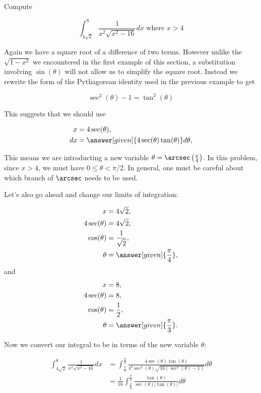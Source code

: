 \documentclass{ximera}
\begin{document}
\begin{example}
Compute 

\[
\int_{4\sqrt{2}}^{8} \frac{1}{ x^{2}\sqrt{x^{2}-16}} dx \text{ where } x > 4
\]

\begin{explanation}
Again we have a square root of a difference of two terms. However unlike the $\sqrt{1-x^{2}}$ we encountered 
in the first example of this section, a substitution involving $\sin(\theta)$ will not allow us to simplify 
the square root. Instead we rewrite the form of the Pythagorean identity used in the previous example to get 

\[
\sec^{2}(\theta)-1=\tan^{2}(\theta)
\]

This suggests that we should use 

 \begin{align*}
      x &= 4\sec(\theta),\\
      dx &= \answer[given]{4\sec(\theta)\tan(\theta)} d\theta,
    \end{align*}

\begin{remark}
This means we are introducting a new variable $\theta=\arcsec\left(\frac{x}{4}\right)$. 
In this problem, since $x > 4$, we must have $0 \leq \theta < \pi/2 $.  In general, one must be careful about which branch of $\arcsec$ needs to be used. 
\end{remark}
Let's also go ahead and change our limits of integration:


    \begin{align*}
      x &= 4\sqrt{2},\\
     4 \sec(\theta) &=4\sqrt{2},\\
       \cos(\theta)&=\frac{1}{\sqrt{2}}, \\
      \theta &= \answer[given]{\frac{\pi}{4}},
    \end{align*}
    and
    \begin{align*}
      x &= 8,\\
     4 \sec(\theta) &= 8,\\
        \cos(\theta)&=\frac{1}{2}, \\
      \theta &= \answer[given]{\frac{\pi}{3}}.
    \end{align*}


Now we convert our integral to be in terms of the new variable $\theta$:

    \begin{align*}
      \int_{4\sqrt{2}}^{8} \frac{1}{x^{2}\sqrt{x^{2}-16}} dx &= \int_{\frac{\pi}{4}}^{\frac{\pi}{3}} \frac{ 4\sec(\theta)\tan(\theta)}{ 4^{2}\sec^{2}(\theta) \sqrt{ 16(\sec^{2}(\theta)-1) }} d\theta \\
      &=\frac{1}{16}\int_{\frac{\pi}{4}}^{\frac{\pi}{3}} \frac{\tan(\theta)}{\sec(\theta) |\tan(\theta)|}  d\theta
          \end{align*}


\end{explanation}
\end{example}
\end{document}
